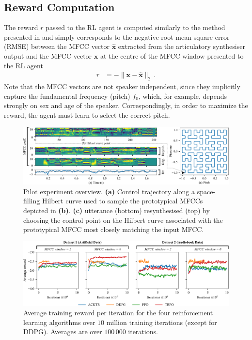 \documentclass[letterpaper,10pt,conference]{ieeeconf}
\renewcommand{\vec}[1]{\bm{#1}}
\begin{document}
\subsection{Reward Computation}

The reward $r$ passed to the RL agent is computed similarly to the method presented in \cite{prom-on2013training} and simply corresponds to the negative root mean square error (RMSE) between the MFCC vector $\vec{\hat x}$ extracted from the articulatory synthesiser output and the MFCC vector $\vec{x}$ at the centre of the MFCC window presented to the RL agent
\begin{align}
	r &= - \| \vec x - \vec{\hat x} \|_2 \,.
	\label{eqn:reward}
\end{align}
Note that the MFCC vectors are not speaker independent, since they implicitly capture the fundamental frequency (pitch) $f_0$, which, for example, depends strongly on sex and age of the speaker. Correspondingly, in order to maximize the reward, the agent must learn to select the correct pitch.


\begin{figure}[p]
	\centering
	\includegraphics[scale=0.825]{media/hilbert.pdf}
	\caption{Pilot experiment overview. \textbf{(a)} Control trajectory along a space-filling Hilbert curve used to sample the prototypical MFCCs depicted in \textbf{(b)}. \textbf{(c)} utterance (bottom) resynthesised (top) by choosing the control point on the Hilbert curve associated with the prototypical MFCC most closely matching the input MFCC.}
	\label{fig:hilbert}
\end{figure}

\begin{figure}[p]
	\centering
	\includegraphics[scale=0.825]{media/results.pdf}
	\caption{Average training reward per iteration for the four reinforcement learning algorithms over $10$ million training iterations (except for DDPG). Averages are over $100\,000$ iterations.}
	\label{fig:results}
\end{figure}
\end{document}
